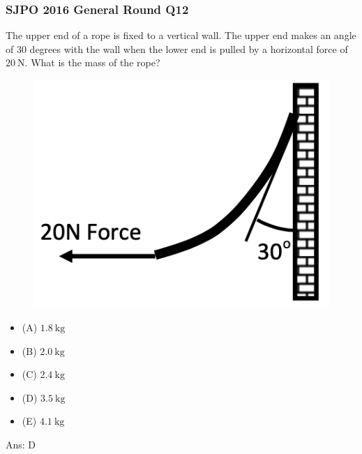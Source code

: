 \documentclass{article}
\begin{document}
\subsubsection{SJPO 2016 General Round Q12}
The upper end of a rope is fixed to a vertical wall. The upper end makes an angle of 30 degrees with the wall when the lower end is pulled by a horizontal force of $20 \mathrm{~N}$. What is the mass of the rope? \\
{
\begin{figure}
\includegraphics[width=1.0\linewidth]{images/sjpo2016q12.png}
\end{figure}
\begin{itemize}
\item[] (A) $1.8 \mathrm{~kg}$
\item[] (B) $2.0 \mathrm{~kg}$
\item[] (C) $2.4 \mathrm{~kg}$
\item[] (D) $3.5 \mathrm{~kg}$
\item[] (E) $4.1 \mathrm{~kg}$
\end{itemize}
}
Ans: \ifpaper D \fi
\end{document}
